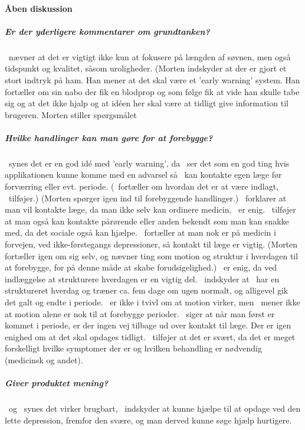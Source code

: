 \paragraph{Åben diskussion}

\subparagraph{Er der yderligere kommentarer om grundtanken?}
\pa~nævner at det er vigtigt ikke kun at fokusere på længden af søvnen, men også tidspunkt og kvalitet, såsom uroligheder.
(Morten indskyder at der er gjort et stort indtryk på ham.
Han mener at det skal være et 'early warning' system.
Han fortæller om sin nabo der fik en blodprop og som følge fik at vide han skulle tabe sig og at det ikke hjalp og at idéen her skal være at tidligt give information til brugeren.
Morten stiller spørgsmålet \subparagraph{Hvilke handlinger kan man gøre for at forebygge?}
\pa~synes det er en god idé med 'early warning', da \pa~ser det som en god ting hvis applikationen kunne komme med en advarsel så \pa~kan kontakte egen læge før forværring eller evt. periode.
(\pd~fortæller om hvordan det er at være indlagt, \pe~tilføjer.)
(Morten spørger igen ind til forebyggende handlinger.)
\pa~forklarer at man vil kontakte læge, da man ikke selv kan ordinere medicin, \pe~er enig.
\pa~tilføjer at man også kan kontakte pårørende eller anden bekendt som man kan snakke med, da det sociale også kan hjælpe.
\pe~fortæller at man nok er på medicin i forvejen, ved ikke-førstegangs depressioner, så kontakt til læge er vigtig.
(Morten fortæller igen om sig selv, og nævner ting som motion og struktur i hverdagen til at forebygge, for på denne måde at skabe forudsigelighed.)
\pe~er enig, da ved indlæggelse at strukturere hverdagen er en vigtig del.
\pa~indskyder at \pa~har en struktureret hverdag og træner ca. fem dage om ugen normalt, og alligevel gik det galt og endte i periode.
\pa~er ikke i tvivl om at motion virker, men \pe~mener ikke at motion alene er nok til at forebygge perioder.
\pc~siger at når man først er kommet i periode, er der ingen vej tilbage ud over kontakt til læge.
Der er igen enighed om at det skal opdages tidligt.
\pa~tilføjer at det er svært, da det er meget forskelligt hvilke symptomer der er og hvilken behandling er nødvendig (medicinsk og andet).

\subparagraph{Giver produktet mening?}
\pa~og \pe~synes det virker brugbart, \pc~indskyder at kunne hjælpe til at opdage ved den lette depression, fremfor den svære, og man derved kunne søge hjælp hurtigere.

